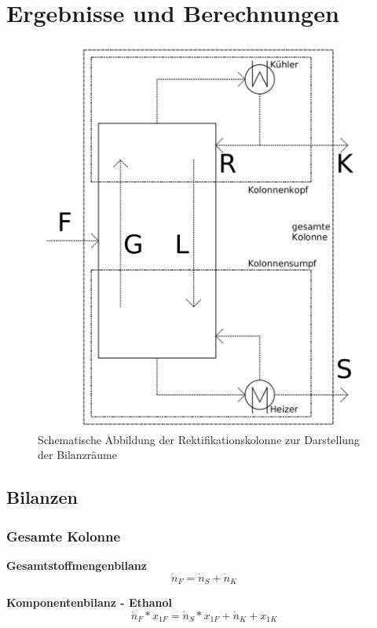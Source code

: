 \newpage
\section{Ergebnisse und Berechnungen}
\label{sec:ergebnisse}
\begin{figure}[h!]
	\centering
	\includegraphics[width=0.7\linewidth]{img/Bilanzraumm}
	\caption{Schematische Abbildung der Rektifikationskolonne zur Darstellung der Bilanzräume}
	\label{fig:Bilanzraumm}
\end{figure}
\FloatBarrier
\subsection{Bilanzen}
\subsubsection{Gesamte Kolonne}

\hspace{5mm}\textbf{Gesamtstoffmengenbilanz}\\
\begin{equation}\label{gl:gesamtmolbilanzKOLONNE}
\dot{n}_F=\dot{n}_S+\dot{n}_K
\end{equation}

\hspace{5mm}\textbf{Komponentenbilanz - Ethanol} \\
\begin{equation}\label{gl:komponentenbilanzKOLONNE}
\dot{n}_F*x_{1F}=\dot{n}_S*x_{1F}+\dot{n}_K+x_{1K}
\end{equation}

